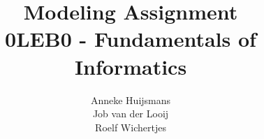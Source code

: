 \title{Modeling Assignment\\0LEB0 - Fundamentals of Informatics}
\author{Anneke Huijsmans\\Job van der Looij\\Roelf Wichertjes}
\newcommand{\footertitle}{0LEB0 - Modeling Assignment}
\newcommand{\preamble}{}



